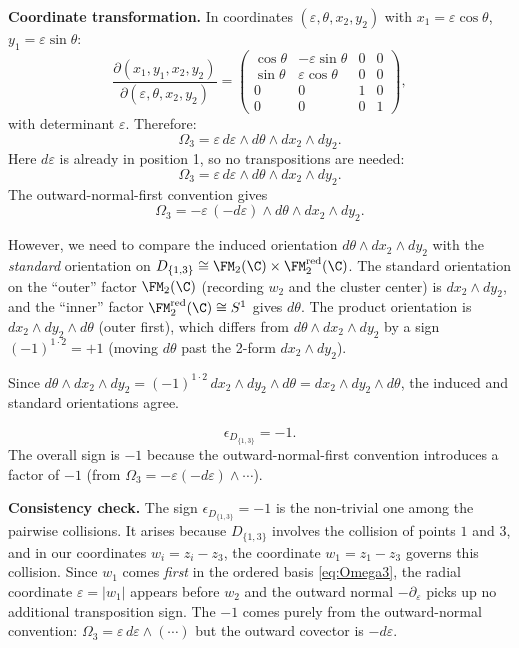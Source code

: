 \textbf{Coordinate transformation.} In coordinates $(\varepsilon,\theta,x_2,y_2)$ with $x_1 = \varepsilon\cos\theta$, $y_1 = \varepsilon\sin\theta$:
\[
\frac{\partial(x_1,y_1,x_2,y_2)}{\partial(\varepsilon,\theta,x_2,y_2)} = \begin{pmatrix}\cos\theta & -\varepsilon\sin\theta & 0&0\\ \sin\theta & \varepsilon\cos\theta & 0&0\\ 0&0&1&0\\ 0&0&0&1\end{pmatrix},
\]
with determinant $\varepsilon$. Therefore:
\[
\Omega_3 = \varepsilon\,d\varepsilon\wedge d\theta\wedge dx_2\wedge dy_2.
\]
Here $d\varepsilon$ is already in position 1, so no transpositions are needed:
\[
\Omega_3 = \varepsilon\,d\varepsilon\wedge d\theta\wedge dx_2\wedge dy_2.
\]
The outward-normal-first convention gives
\[
\Omega_3 = -\varepsilon\,(-d\varepsilon)\wedge d\theta\wedge dx_2\wedge dy_2.
\]

However, we need to compare the induced orientation $d\theta\wedge dx_2\wedge dy_2$ with the \emph{standard} orientation on $D_{\{1,3\}} \cong \FM_2(\C)\times \FM_2^{\mathrm{red}}(\C)$. The standard orientation on the ``outer'' factor $\FM_2(\C)$ (recording $w_2$ and the cluster center) is $dx_2\wedge dy_2$, and the ``inner'' factor $\FM_2^{\mathrm{red}}(\C) \cong S^1$ gives $d\theta$. The product orientation is $dx_2\wedge dy_2\wedge d\theta$ (outer first), which differs from $d\theta\wedge dx_2\wedge dy_2$ by a sign $(-1)^{1\cdot 2} = +1$ (moving $d\theta$ past the 2-form $dx_2\wedge dy_2$).

Since $d\theta\wedge dx_2\wedge dy_2 = (-1)^{1\cdot 2}\,dx_2\wedge dy_2\wedge d\theta = dx_2\wedge dy_2\wedge d\theta$, the induced and standard orientations agree.

\begin{equation}
\label{eq:eps-D13}
\boxed{\epsilon_{D_{\{1,3\}}} = -1.}
\end{equation}
The overall sign is $-1$ because the outward-normal-first convention introduces a factor of $-1$ (from $\Omega_3 = -\varepsilon(-d\varepsilon)\wedge\cdots$).

\noindent\textbf{Consistency check.} The sign $\epsilon_{D_{\{1,3\}}} = -1$ is the non-trivial one among the pairwise collisions. It arises because $D_{\{1,3\}}$ involves the collision of points $1$ and $3$, and in our coordinates $w_i = z_i - z_3$, the coordinate $w_1 = z_1 - z_3$ governs this collision. Since $w_1$ comes \emph{first} in the ordered basis \eqref{eq:Omega3}, the radial coordinate $\varepsilon = |w_1|$ appears before $w_2$ and the outward normal $-\partial_\varepsilon$ picks up no additional transposition sign. The $-1$ comes purely from the outward-normal convention: $\Omega_3 = \varepsilon\,d\varepsilon\wedge(\cdots)$ but the outward covector is $-d\varepsilon$.

